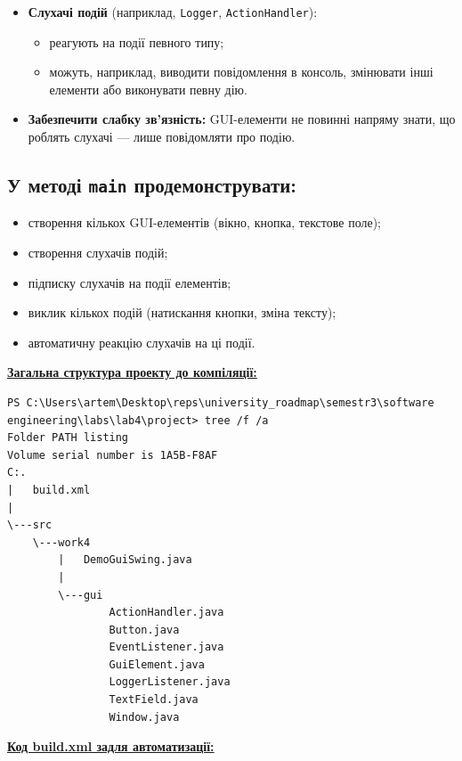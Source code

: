 \documentclass[12pt,a4paper]{article}
\begin{document}
\begin{itemize}
    \item \textbf{Слухачі подій} (наприклад, \texttt{Logger}, \texttt{ActionHandler}):
    \begin{itemize}
        \item реагують на події певного типу;
        \item можуть, наприклад, виводити повідомлення в консоль, змінювати інші елементи або виконувати певну дію.
    \end{itemize}

    \item \textbf{Забезпечити слабку зв’язність:} GUI-елементи не повинні напряму знати, що роблять слухачі — лише повідомляти про подію.
    \end{itemize}

    \subsection*{У методі \texttt{main} продемонструвати:}
    \begin{itemize}
    \item створення кількох GUI-елементів (вікно, кнопка, текстове поле);
    \item створення слухачів подій;
    \item підписку слухачів на події елементів;
    \item виклик кількох подій (натискання кнопки, зміна тексту);
    \item автоматичну реакцію слухачів на ці події.
    \end{itemize}

    \setlength{\parindent}{0em}

    \textbf{\underline{Загальна структура проекту до компіляції:}}

    \begin{verbatim}
PS C:\Users\artem\Desktop\reps\university_roadmap\semestr3\software engineering\labs\lab4\project> tree /f /a
Folder PATH listing
Volume serial number is 1A5B-F8AF
C:.
|   build.xml
|
\---src
    \---work4
        |   DemoGuiSwing.java
        |
        \---gui
                ActionHandler.java
                Button.java
                EventListener.java
                GuiElement.java
                LoggerListener.java
                TextField.java
                Window.java
    \end{verbatim}

    \textbf{\underline{Код build.xml задля автоматизації:}}
\end{document}
